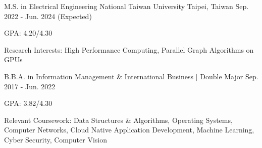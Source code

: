 

\begin{cventries}

  \cventry
    {M.S. in Electrical Engineering} %
    {National Taiwan University} %
    {Taipei, Taiwan} %
    {Sep. 2022 - Jun. 2024 (Expected)} %
    {
      \begin{cvitems} %
        \item {GPA: 4.20/4.30}
        \item {Research Interests: High Performance Computing, Parallel Graph Algorithms on GPUs}
      \end{cvitems}
    }

  \cventry
    {B.B.A. in Information Management \& International Business | Double Major} %
    {} %
    {} %
    {Sep. 2017 - Jun. 2022} %
    {
      \begin{cvitems}
        \item GPA: 3.82/4.30
        \item {Relevant Coursework: Data Structures \& Algorithms, Operating Systems, Computer Networks, Cloud Native Application Development, Machine Learning, Cyber Security, Computer Vision}
      \end{cvitems}
    }
\end{cventries}
